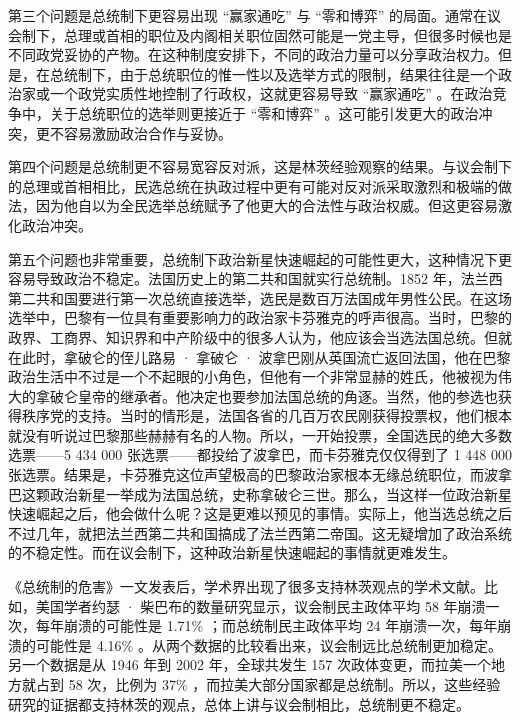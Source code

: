第三个问题是总统制下更容易出现 “赢家通吃” 与 “零和博弈” 的局面。通常在议会制下，总理或首相的职位及内阁相关职位固然可能是一党主导，但很多时候也是不同政党妥协的产物。在这种制度安排下，不同的政治力量可以分享政治权力。但是，在总统制下，由于总统职位的惟一性以及选举方式的限制，结果往往是一个政治家或一个政党实质性地控制了行政权，这就更容易导致 “赢家通吃” 。在政治竞争中，关于总统职位的选举则更接近于 “零和博弈” 。这可能引发更大的政治冲突，更不容易激励政治合作与妥协。

第四个问题是总统制更不容易宽容反对派，这是林茨经验观察的结果。与议会制下的总理或首相相比，民选总统在执政过程中更有可能对反对派采取激烈和极端的做法，因为他自以为全民选举总统赋予了他更大的合法性与政治权威。但这更容易激化政治冲突。

第五个问题也非常重要，总统制下政治新星快速崛起的可能性更大，这种情况下更容易导致政治不稳定。法国历史上的第二共和国就实行总统制。1852 年，法兰西第二共和国要进行第一次总统直接选举，选民是数百万法国成年男性公民。在这场选举中，巴黎有一位具有重要影响力的政治家卡芬雅克的呼声很高。当时，巴黎的政界、工商界、知识界和中产阶级中的很多人认为，他应该会当选法国总统。但就在此时，拿破仑的侄儿路易 · 拿破仑 · 波拿巴刚从英国流亡返回法国，他在巴黎政治生活中不过是一个不起眼的小角色，但他有一个非常显赫的姓氏，他被视为伟大的拿破仑皇帝的继承者。他决定也要参加法国总统的角逐。当然，他的参选也获得秩序党的支持。当时的情形是，法国各省的几百万农民刚获得投票权，他们根本就没有听说过巴黎那些赫赫有名的人物。所以，一开始投票，全国选民的绝大多数选票——5 434 000 张选票——都投给了波拿巴，而卡芬雅克仅仅得到了 1 448 000 张选票。结果是，卡芬雅克这位声望极高的巴黎政治家根本无缘总统职位，而波拿巴这颗政治新星一举成为法国总统，史称拿破仑三世。那么，当这样一位政治新星快速崛起之后，他会做什么呢？这是更难以预见的事情。实际上，他当选总统之后不过几年，就把法兰西第二共和国搞成了法兰西第二帝国。这无疑增加了政治系统的不稳定性。而在议会制下，这种政治新星快速崛起的事情就更难发生。

《总统制的危害》一文发表后，学术界出现了很多支持林茨观点的学术文献。比如，美国学者约瑟 · 柴巴布的数量研究显示，议会制民主政体平均 58 年崩溃一次，每年崩溃的可能性是 1.71\% ；而总统制民主政体平均 24 年崩溃一次，每年崩溃的可能性是 4.16\% 。从两个数据的比较看出来，议会制远比总统制更加稳定。另一个数据是从 1946 年到 2002 年，全球共发生 157 次政体变更，而拉美一个地方就占到 58 次，比例为 37\% ，而拉美大部分国家都是总统制。所以，这些经验研究的证据都支持林茨的观点，总体上讲与议会制相比，总统制更不稳定。

